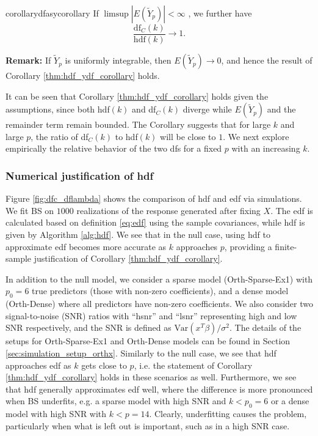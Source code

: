 \begin{restatable}{corollary}{dfasycorollary}
	\label{thm:hdf_ydf_corollary}
	If $\limsup |E(\tilde{Y}_p)| < \infty$ , we further have
	\begin{equation}
	\label{eq:main_corollary}
	\frac{\text{df}_C(k)}{\text{hdf}(k)} \rightarrow 1.
	\end{equation}
\end{restatable}
\noindent\textbf{Remark:} If $\tilde{Y}_p$ is uniformly integrable, then $E(\tilde{Y}_p) \rightarrow 0$, and hence the result of Corollary \ref{thm:hdf_ydf_corollary} holds.

It can be seen that Corollary \ref{thm:hdf_ydf_corollary} holds given the assumptions, since both hdf$(k)$ and df$_C(k)$ diverge while $E(\tilde{Y}_p)$ and the remainder term remain bounded. The Corollary suggests that for large $k$ and large $p$, the ratio of df$_C(k)$ to hdf$(k)$ will be close to $1$. We next explore empirically the relative behavior of the two dfs for a fixed $p$ with an increasing $k$. 

\subsubsection{Numerical justification of hdf}
Figure \ref{fig:dfc_dflambda} shows the comparison of hdf and edf via simulations. We fit BS on $1000$ realizations of the response generated after fixing $X$. The edf is calculated based on definition \eqref{eq:edf} using the sample covariances, while hdf is given by Algorithm \ref{alg:hdf}. We see that in the null case, using hdf to approximate edf becomes more accurate as $k$ approaches $p$, providing a finite-sample justification of Corollary \ref{thm:hdf_ydf_corollary}. 

In addition to the null model, we consider a sparse model (Orth-Sparse-Ex1) with $p_0=6$ true predictors (those with non-zero coefficients), and a dense model (Orth-Dense) where all predictors have non-zero coefficients. We also consider two signal-to-noise (SNR) ratios with ``hsnr'' and ``lsnr'' representing high and low SNR respectively, and the SNR is defined as $\text{Var}(x^T \beta)/\sigma^2$. The details of the setups for Orth-Sparse-Ex1 and Orth-Dense models can be found in Section \ref{sec:simulation_setup_orthx}. Similarly to the null case, we see that hdf approaches edf as $k$ gets close to $p$, i.e. the statement of Corollary \ref{thm:hdf_ydf_corollary} holds in these scenarios as well. Furthermore, we see that hdf generally approximates edf well, where the difference is more pronounced when BS underfits, e.g. a sparse model with high SNR and $k<p_0=6$ or a dense model with high SNR with $k<p=14$. Clearly, underfitting causes the problem, particularly when what is left out is important, such as in a high SNR case.   


